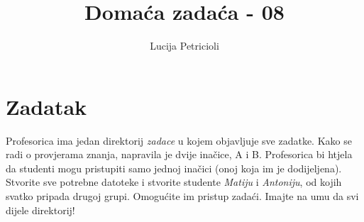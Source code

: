 \documentclass[12pt,a4paper]{article}
\begin{document}
	\title{Domaća zadaća - 08}
	\maketitle
	\author{Lucija Petricioli}
	\section{Zadatak}
	Profesorica ima jedan direktorij \textit{zadace} u kojem objavljuje sve zadatke. Kako se radi o provjerama znanja, napravila je dvije inačice, A i B. Profesorica bi htjela da studenti mogu pristupiti samo jednoj inačici (onoj koja im je dodijeljena). \\
	Stvorite sve potrebne datoteke i stvorite studente \textit{Matiju} i \textit{Antoniju}, od kojih svatko pripada drugoj grupi. Omogućite im pristup zadaći. Imajte na umu da  svi dijele direktorij!
	
\end{document}
